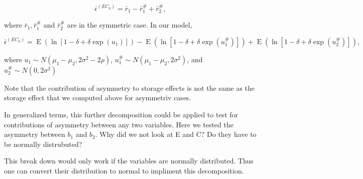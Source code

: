 \documentclass[letterpaper,11pt]{article}
\DeclareMathOperator{\EX}{E}%
\begin{document}
\begin{equation}
\bar \epsilon^{( {EC_0})} = \bar r_1 - \bar r_1^{\#} + \bar r_2^{\#},
\end{equation}

\noindent where $ \bar r_1, \bar r_1^{\#}$ and $\bar r_2^{\#}$ are in the symmetric case. In our model,

\begin{equation}
\bar \epsilon^{( {EC_0})} = \EX(\ln[1-\delta+\delta \exp(u_1)]) - \EX(\ln[1-\delta+\delta \exp(u_1^{\#})]) + \EX(\ln[1-\delta+\delta \exp(u_2^{\#})]),
\end{equation}

\noindent where $u_1 \sim N(\mu_1-\mu_2, 2\sigma^2-2\rho)$, $u_1^{\#} \sim N(\mu_1-\mu_2, 2\sigma^2)$, and $u_2^{\#} \sim N(0, 2\sigma^2)$

\noindent *Note that the contribution of asymmetry to storage effects is not the same as the storage effect that we computed above for asymmetriv cases. 

In generalized terms, this further decomposition could be applied to test for contributions of asymmetry between any two variables. Here we tested the asymmetry between $b_1$ and $b_2$. Why did we not look at E and C? Do they have to be normally distrubuted?

This break down would only work if the variables are normally distributed. Thus one can convert their distribution to normal to impliment this decomposition.
\end{document}
